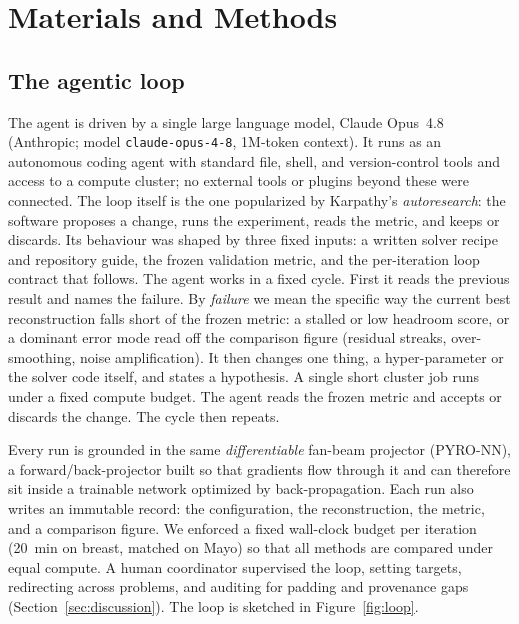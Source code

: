 \documentclass[AMA,twocolumn]{USG} %
\begin{document}
\section{Materials and Methods}\label{sec:methods}

\subsection{The agentic loop}\label{sec:loop}

The agent is driven by a single large language model, Claude Opus~4.8 (Anthropic; model \texttt{claude-opus-4-8}, 1M-token context). It runs as an autonomous coding agent with standard file, shell, and version-control tools and access to a compute cluster; no external tools or plugins beyond these were connected. The loop itself is the one popularized by Karpathy's \emph{autoresearch}:\cite{karpathy2026autoresearch} the software proposes a change, runs the experiment, reads the metric, and keeps or discards. Its behaviour was shaped by three fixed inputs: a written solver recipe and repository guide, the frozen validation metric, and the per-iteration loop contract that follows. The agent works in a fixed cycle. First it reads the previous result and names the failure. By \emph{failure} we mean the specific way the current best reconstruction falls short of the frozen metric: a stalled or low headroom score, or a dominant error mode read off the comparison figure (residual streaks, over-smoothing, noise amplification). It then changes one thing, a hyper-parameter or the solver code itself, and states a hypothesis. A single short cluster job runs under a fixed compute budget. The agent reads the frozen metric and accepts or discards the change. The cycle then repeats.

Every run is grounded in the same \emph{differentiable} fan-beam projector (PYRO-NN\cite{syben2019pyronn}), a forward/back-projector built so that gradients flow through it and can therefore sit inside a trainable network optimized by back-propagation. Each run also writes an immutable record: the configuration, the reconstruction, the metric, and a comparison figure. We enforced a fixed wall-clock budget per iteration (20~min on breast, matched on Mayo) so that all methods are compared under equal compute. A human coordinator supervised the loop, setting targets, redirecting across problems, and auditing for padding and provenance gaps (Section~\ref{sec:discussion}). The loop is sketched in Figure~\ref{fig:loop}.
\end{document}
